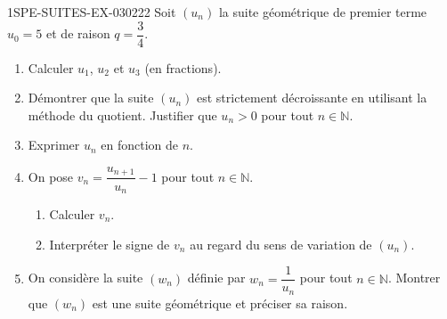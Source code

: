 \begin{exercice}{1SPE-SUITES-EX-030}{2}{22}
Soit $(u_n)$ la suite géométrique de premier terme $u_0 = 5$ et de raison $q = \dfrac{3}{4}$.

\begin{enumerate}
  \item Calculer $u_1$, $u_2$ et $u_3$ (en fractions).

  \item Démontrer que la suite $(u_n)$ est strictement décroissante en utilisant la méthode du quotient. Justifier que $u_n > 0$ pour tout $n \in \mathbb{N}$.

  \item Exprimer $u_n$ en fonction de $n$.

  \item On pose $v_n = \dfrac{u_{n+1}}{u_n} - 1$ pour tout $n \in \mathbb{N}$.
  \begin{enumerate}
    \item Calculer $v_n$.
    \item Interpréter le signe de $v_n$ au regard du sens de variation de $(u_n)$.
  \end{enumerate}

  \item On considère la suite $(w_n)$ définie par $w_n = \dfrac{1}{u_n}$ pour tout $n \in \mathbb{N}$. Montrer que $(w_n)$ est une suite géométrique et préciser sa raison.
\end{enumerate}
\end{exercice}
